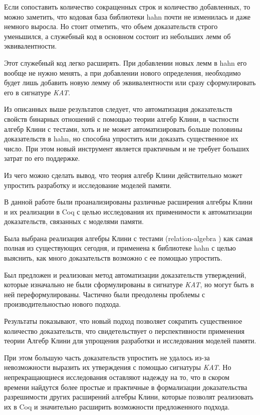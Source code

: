 \documentclass[times
              ,specification
              ,annotation
              ]{itmo-student-thesis}
\begin{document}
      Если сопоставить количество сокращенных строк и количество добавленных, то можно заметить, что
      кодовая база библиотеки hahn почти не изменилась и даже немного выросла.
      Но стоит отметить, что объем доказательств строго уменьшился, а служебный код в основном состоит
      из небольших лемм об эквивалентности.

      Этот служебный код легко расширять.
      При добавлении новых лемм в hahn его вообще не нужно менять, а при
      добавлении нового определения, необходимо будет лишь добавить новую лемму об
      эквивалентности или сразу сформулировать его в сигнатуре \textit{KAT}.
      
  \chapterconclusion

    Из описанных выше результатов следует, что автоматизация доказательств свойств бинарных отношений с
    помощью теории алгебр Клини, в частности алгебр Клини с тестами, хоть и не может автоматизировать
    больше половины доказательств в hahn, но способна упростить или доказать существенное их число.
    При этом новый инструмент является практичным и не требует больших затрат по его
    поддержке.

    Из чего можно сделать вывод, что теория алгебр Клини действительно может упростить разработку и
    исследование моделей памяти.

\startconclusionpage

  В данной работе были проанализированы различные расширения алгебры Клини и их реализации в Coq
  с целью исследования их применимости к автоматизации доказательств, связанных с моделями памяти.

  Была выбрана реализация алгебры Клини с тестами (relation-algebra \cite{kat}) как самая полная из
  существующих сегодня, и применена к
  библиотеке hahn с целью выяснить, как много доказательств возможно с ее помощью упростить.

  Был предложен и реализован метод автоматизации доказательств утверждений, которые изначально не
  были сформулированы в сигнатуре \textit{KAT}, но могут быть в ней переформулированы.
  Частично были преодолены проблемы с производительностью нового подхода.

  Результаты показывают, что новый подход позволяет сократить существенное количество доказательств,
  что свидетельствует о перспективности применения теории Алгебр Клини для упрощения разработки и
  исследования моделей памяти.

  При этом большую часть доказательств упростить не удалось из-за невозможности выразить их
  утверждения с помощью сигнатуры \textit{KAT}.
  Но непрекращающиеся исследования оставляют надежду на то, что в скором времени найдутся более простые и
  практичные в формализации доказательства разрешимости других расширений алгебры Клини, которые
  позволят реализовать их в Coq и значительно расширить возможности предложенного подхода.

\printmainbibliography

\appendix

\end{document}
